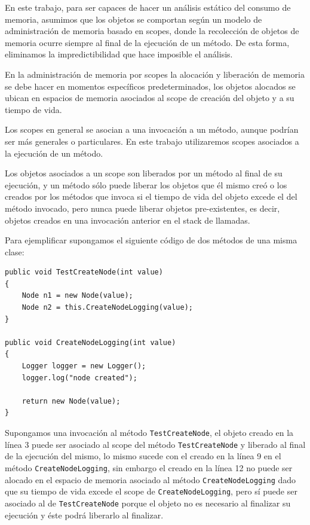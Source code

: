 \documentclass[12pt,a4paper]{article}
\newcommand\mono[1]{\texttt{#1}}
\begin{document}
			En este trabajo, para ser capaces de hacer un análisis estático del consumo de memoria, asumimos que los objetos se comportan según un modelo de administración de memoria basado en scopes, donde la recolección de objetos de memoria ocurre siempre al final de la ejecución de un método. De esta forma, eliminamos la impredictibilidad que hace imposible el análisis.

			En la administración de memoria por scopes la alocación y liberación de memoria se debe hacer en momentos específicos predeterminados, los objetos alocados se ubican en espacios de memoria asociados al scope de creación del objeto y a su tiempo de vida.

			Los scopes en general se asocian a una invocación a un método, aunque podrían ser más generales o particulares. En este trabajo utilizaremos scopes asociados a la ejecución de un método.

			Los objetos asociados a un scope son liberados por un método al final de su ejecución, y un método sólo puede liberar los objetos que él mismo creó o los creados por los métodos que invoca si el tiempo de vida del objeto excede el del método invocado, pero nunca puede liberar objetos pre-existentes, es decir, objetos creados en una invocación anterior en el stack de llamadas.

			Para ejemplificar supongamos el siguiente código de dos métodos de una misma clase:

			\vspace{15pt}
			\begin{lstlisting}[caption=Asociación de objetos a scopes, label=regsmets]
public void TestCreateNode(int value)
{
	Node n1 = new Node(value);
	Node n2 = this.CreateNodeLogging(value);
}

public void CreateNodeLogging(int value)
{
	Logger logger = new Logger();
	logger.log("node created");

	return new Node(value);
}
			\end{lstlisting}

			Supongamos una invocación al método \mono{TestCreateNode}, el objeto creado en la línea 3 puede ser asociado al scope del método \mono{TestCreateNode} y liberado al final de la ejecución del mismo, lo mismo sucede con el creado en la línea 9 en el método \mono{CreateNodeLogging}, sin embargo el creado en la línea 12 no puede ser alocado en el espacio de memoria asociado al método \mono{CreateNodeLogging} dado que su tiempo de vida excede el scope de \mono{CreateNodeLogging}, pero sí puede ser asociado al de \mono{TestCreateNode} porque el objeto no es necesario al finalizar su ejecución y éste podrá liberarlo al finalizar.
\end{document}
